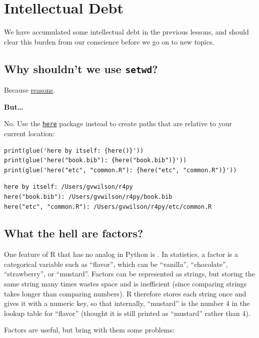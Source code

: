 \chapter{Intellectual Debt}\label{debt}

We have accumulated some intellectual debt in the previous lessons,
and should clear this burden from our conscience before we go on to new topics.

\section{Why shouldn't we use \texttt{setwd}?}

Because \href{https://www.tidyverse.org/articles/2017/12/workflow-vs-script/}{reasons}.

\textbf{But{\ldots}}

No.
Use the \href{https://cran.r-project.org/web/packages/here/index.html}{\texttt{here}} package instead
to create paths that are relative to your current location:

\begin{lstlisting}
print(glue('here by itself: {here()}'))
print(glue('here("book.bib"): {here("book.bib")}'))
print(glue('here("etc", "common.R"): {here("etc", "common.R")}'))
\end{lstlisting}

\begin{lstlisting}
here by itself: /Users/gvwilson/r4py
here("book.bib"): /Users/gvwilson/r4py/book.bib
here("etc", "common.R"): /Users/gvwilson/r4py/etc/common.R
\end{lstlisting}

\section{What the hell are factors?}

One feature of R that has no analog in Python is .
In statistics, a factor is a categorical variable such as ``flavor'',
which can be ``vanilla'', ``chocolate'', ``strawberry'', or ``mustard''.
Factors can be represented as strings,
but storing the same string many times wastes space and is inefficient
(since comparing strings takes longer than comparing numbers).
R therefore stores each string once and gives it with a numeric key,
so that internally, ``mustard'' is the number 4 in the lookup table for ``flavor''
(thought it is still printed as ``mustard'' rather than 4).

Factors are useful, but bring with them some problems:

